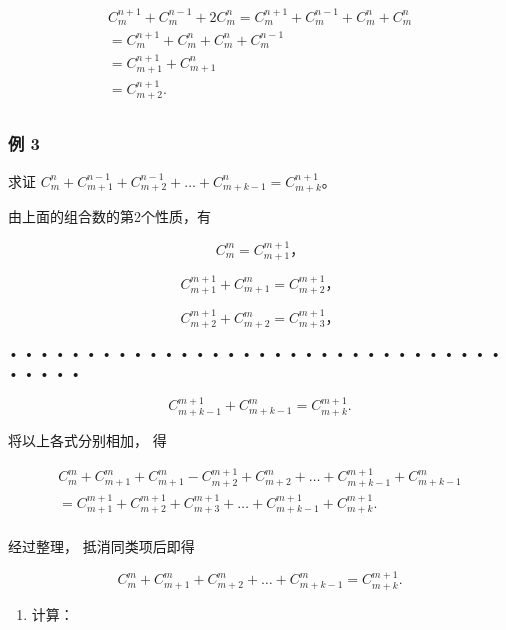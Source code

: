 \[
\begin{array}{l} C _ {m} ^ {n + 1} + C _ {m} ^ {n - 1} + 2 C _ {m} ^ {n} = C _ {m} ^ {n + 1} + C _ {m} ^ {n - 1} + C _ {m} ^ {n} + C _ {m} ^ {n} \\ = C _ {m} ^ {n + 1} + C _ {m} ^ {n} + C _ {m} ^ {n} + C _ {m} ^ {n - 1} \\ = C _ {m + 1} ^ {n + 1} + C _ {m + 1} ^ {n} \\ = C _ {m + 2} ^ {n + 1}. \\ \end{array}
\]

\subsubsection{例 3}

求证
\(C_{m}^{n} + C_{m + 1}^{n - 1} + C_{m + 2}^{n - 1} + \dots + C_{m + k - 1}^{n} = C_{m + k}^{n + 1}\)。

 由上面的组合数的第2个性质，有

\[
C _ {m} ^ {m} = C _ {m + 1} ^ {m + 1}\text{，}
\]

\[
C _ {m + 1} ^ {m + 1} + C _ {m + 1} ^ {m} = C _ {m + 2} ^ {m + 1}\text{，}
\]

\[
C _ {m + 2} ^ {m + 1} + C _ {m + 2} ^ {m} = C _ {m + 3} ^ {m + 1}\text{，}
\]

• • • • • • • • • • • • • • • • • • • • • • • • • • • • • • • • • • • •
•

\[
C _ {m + k - 1} ^ {m + 1} + C _ {m + k - 1} ^ {m} = C _ {m + k} ^ {m + 1}.
\]

将以上各式分别相加， 得

\[
\begin{array}{l} C _ {m} ^ {m} + C _ {m + 1} ^ {m} + C _ {m + 1} ^ {m} - C _ {m + 2} ^ {m + 1} + C _ {m + 2} ^ {m} + \dots + C _ {m + k - 1} ^ {m + 1} + C _ {m + k - 1} ^ {m} \\ = C _ {m + 1} ^ {m + 1} + C _ {m + 2} ^ {m + 1} + C _ {m + 3} ^ {m + 1} + \dots + C _ {m + k - 1} ^ {m + 1} + C _ {m + k} ^ {m + 1}. \\ \end{array}
\]

经过整理， 抵消同类项后即得

\[
C _ {m} ^ {m} + C _ {m + 1} ^ {m} + C _ {m + 2} ^ {m} + \dots + C _ {m + k - 1} ^ {m} = C _ {m + k} ^ {m + 1}.
\]

\begin{enumerate}
\item
  计算：
\end{enumerate}

